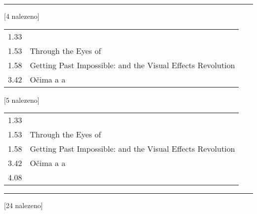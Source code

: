 \begin{table}[H]
\begin{tt}

\mbox{}\vspace{1em}
\hrule
\mbox{}

\noindent
\begin{minipage}[t]{.5\textwidth}\vspace{0pt}
 [4 nalezeno]\vspace{5pt}

\begin{tabulary}{1.1\textwidth}{LL}
1.33 &   \\
1.53 & Through the Eyes of   \\
1.58 & Getting Past Impossible:   and the Visual Effects Revolution \\
3.42 & Očima a a \\
\end{tabulary}
\end{minipage}
\begin{minipage}[t]{.5\textwidth}\vspace{0pt}
 [5 nalezeno]\vspace{5pt}

\begin{tabulary}{1.1\textwidth}{LL}
1.33 &   \\
1.53 & Through the Eyes of   \\
1.58 & Getting Past Impossible:   and the Visual Effects Revolution \\
3.42 & Očima a a \\
4.08 &   \\
\end{tabulary}
\end{minipage}

\mbox{}\vspace{5pt}
\hrule
\mbox{}

\noindent
\begin{minipage}[t]{.5\textwidth}\vspace{0pt}
 [24 nalezeno]\vspace{5pt}


\end{minipage}
\end{tt}
\end{table}

